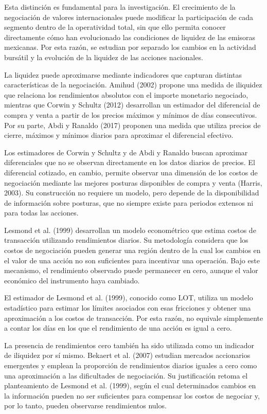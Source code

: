 Esta distinción es fundamental para la investigación. El crecimiento de la negociación de valores internacionales puede modificar la participación de cada segmento dentro de la operatividad total, sin que ello permita conocer directamente cómo han evolucionado las condiciones de liquidez de las emisoras mexicanas. Por esta razón, se estudian por separado los cambios en la actividad bursátil y la evolución de la liquidez de las acciones nacionales.


La liquidez puede aproximarse mediante indicadores que capturan distintas características de la negociación. Amihud (2002) propone una medida de iliquidez que relaciona los rendimientos absolutos con el importe monetario negociado, mientras que Corwin y Schultz (2012) desarrollan un estimador del diferencial de compra y venta a partir de los precios máximos y mínimos de días consecutivos. Por su parte, Abdi y Ranaldo (2017) proponen una medida que utiliza precios de cierre, máximos y mínimos diarios para aproximar el diferencial efectivo.

Los estimadores de Corwin y Schultz y de Abdi y Ranaldo buscan aproximar diferenciales que no se observan directamente en los datos diarios de precios. El diferencial cotizado, en cambio, permite observar una dimensión de los costos de negociación mediante las mejores posturas disponibles de compra y venta (Harris, 2003). Su construcción no requiere un modelo, pero depende de la disponibilidad de información sobre posturas, que no siempre existe para periodos extensos ni para todas las acciones.

Lesmond et al. (1999) desarrollan un modelo econométrico que estima costos de transacción utilizando rendimientos diarios. Su metodología considera que los costos de negociación pueden generar una región dentro de la cual los cambios en el valor de una acción no son suficientes para incentivar una operación. Bajo este mecanismo, el rendimiento observado puede permanecer en cero, aunque el valor económico del instrumento haya cambiado.

El estimador de Lesmond et al. (1999), conocido como LOT, utiliza un modelo estadístico para estimar los límites asociados con esas fricciones y obtener una aproximación a los costos de transacción. Por esta razón, no equivale simplemente a contar los días en los que el rendimiento de una acción es igual a cero.

La presencia de rendimientos cero también ha sido utilizada como un indicador de iliquidez por sí mismo. Bekaert et al. (2007) estudian mercados accionarios emergentes y emplean la proporción de rendimientos diarios iguales a cero como una aproximación a las dificultades de negociación. Su justificación retoma el planteamiento de Lesmond et al. (1999), según el cual determinados cambios en la información pueden no ser suficientes para compensar los costos de negociar y, por lo tanto, pueden observarse rendimientos nulos.

